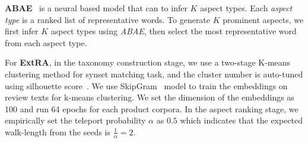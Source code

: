 \textbf{ABAE}~\cite{DBLP:conf/acl/HeLND17}  is a neural based model that can
to infer $K$ aspect types. 
Each \emph{aspect type} is a ranked list of representative words.
To generate $K$ prominent aspects, 
we first infer $K$ aspect types using \emph{ABAE}, 
then select the most representative word from each
aspect type. 

For \textbf{ExtRA}, in the taxonomy construction stage, 
we use a two-stage K-means clustering method for synset matching task, 
and the cluster number
is auto-tuned using silhouette score~\cite{rousseeuw1987silhouettes}.
We use SkipGram~\cite{miko} model to train the embeddings
on review texts for k-means clustering. 
We set the dimension of the embeddings as 100
and run 64 epochs for each product corpora. 
In the aspect ranking stage, 
we empirically set the teleport probability $\alpha$
as $0.5$ which indicates that the expected walk-length
from the seeds is $\frac{1}{\alpha}=2$.


